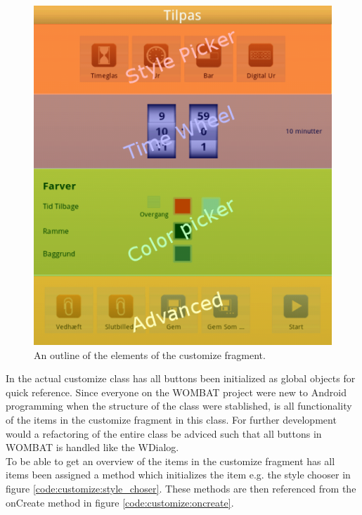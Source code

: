 \begin{figure}[H]
	\centering
		\includegraphics[width=\textwidth]{Images/Implementation/customize_layout.png}
	\caption{An outline of the elements of the customize fragment.}
	\label{fig:customize:layout}
\end{figure}

In the actual customize class has all buttons been initialized as global objects for quick reference.
Since everyone on the WOMBAT project were new to Android programming when the structure of the class were stablished, is all functionality of the items in the customize fragment in this class.
For further development would a refactoring of the entire class be adviced such that all buttons in WOMBAT is handled like the WDialog.\\
To be able to get an overview of the items in the customize fragment has all items been assigned a method which initializes the item e.g. the style chooser in figure \ref{code:customize:style_choser}.
These methods are then referenced from the onCreate method in figure \ref{code:customize:oncreate}.

